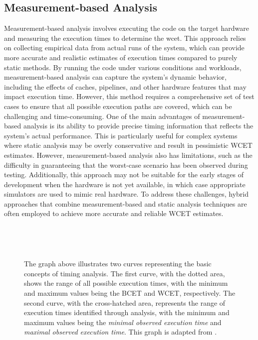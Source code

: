 \subsection{Measurement-based Analysis}\label{sec:measurement_analysis}
Measurement-based analysis involves executing the code on the target hardware and measuring the execution times to determine the \ac{wcet}. 
This approach relies on collecting empirical data from actual runs of the system, which can provide more accurate and realistic estimates of execution times compared to purely static methods. 
By running the code under various conditions and workloads, measurement-based analysis can capture the system's dynamic behavior, including the effects of caches, pipelines, and other hardware features that may impact execution time.
However, this method requires a comprehensive set of test cases to ensure that all possible execution paths are covered, which can be challenging and time-consuming\cite{wilhelmWorstcaseExecutiontimeProblem2008}.
One of the main advantages of measurement-based analysis is its ability to provide precise timing information that reflects the system's actual performance. 
This is particularly useful for complex systems where static analysis may be overly conservative and result in pessimistic WCET estimates.
However, measurement-based analysis also has limitations, such as the difficulty in guaranteeing that the worst-case scenario has been observed during testing. 
Additionally, this approach may not be suitable for the early stages of development when the hardware is not yet available, in which case appropriate simulators are used to mimic real hardware.\cite{wilhelmWorstcaseExecutiontimeProblem2008}
To address these challenges, hybrid approaches that combine measurement-based and static analysis techniques are often employed to achieve more accurate and reliable WCET estimates\cite{kelterWCETAnalysisOptimization}.

\begin{figure}[htbp]
    \centering
    \resizebox{\textwidth}{!}{
        
 }
    \caption{
 The graph above illustrates two curves representing the basic concepts of timing analysis.
 The first curve, with the dotted area, shows the range of all possible execution times, with the minimum and maximum values being the \ac{BCET} and \ac{WCET}, respectively.
 The second curve, with the cross-hatched area, represents the range of execution times identified through analysis, with the minimum and maximum values being the \textit{minimal observed execution time} and \textit{maximal observed execution time}.
 This graph is adapted from \textcite{wilhelmWorstcaseExecutiontimeProblem2008}.
 }
    \label{fig:overestimation}
\end{figure}

